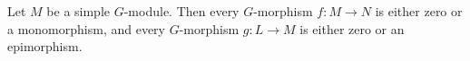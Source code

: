 Let $M$ be a simple $G$-module. Then every $G$-morphism $f: M \to N$ is either zero or a monomorphism, and every $G$-morphism $g: L \to M$ is either zero or an epimorphism.
